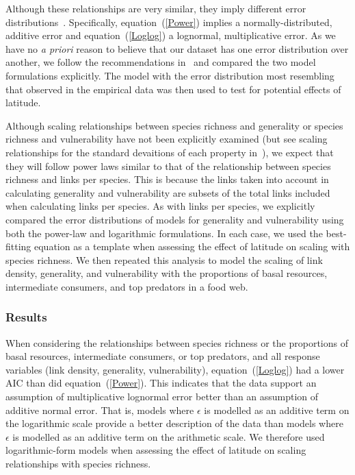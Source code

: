 \documentclass[12pt]{article}
\begin{document}
    \noindent Although these relationships are very similar, they imply different error distributions~\citep{Xiao2011}.
    Specifically, equation~(\ref{Power}) implies a normally-distributed, additive error and equation~(\ref{Loglog}) a lognormal,
    multiplicative error. As we have no \emph{a priori} reason to believe that our dataset has one error distribution
    over another, we follow the recommendations in~\citet{Xiao2011} and compared the two
    model formulations explicitly. The model with the error distribution most resembling that observed in the empirical
    data was then used to test for potential effects of latitude.


    Although scaling relationships between species richness and generality or
    species richness and vulnerability have not been explicitly examined (but see scaling 
    relationships for the standard devaitions of each property in~\citet{Riede2010}), we expect that they will follow
    power laws similar to that of the relationship between species richness and links per species.
    This is because the links taken into account in calculating generality and vulnerability are subsets 
    of the total links included when calculating links per species. As with links per species, we explicitly 
    compared the error distributions of models for generality and vulnerability using
    both the power-law and logarithmic formulations. 
    In each case, we used the best-fitting equation as a template when assessing the effect of latitude on scaling with
    species richness. We then repeated this analysis 
    to model the scaling of link density, generality, 
    and vulnerability with the proportions of basal 
    resources, intermediate consumers, and top predators
    in a food web.


  \subsubsection*{Results}

    When considering the relationships between species richness or the proportions 
    of basal resources, intermediate consumers, or top predators, and all response variables 
    (link density, generality, vulnerability), equation~(\ref{Loglog}) had a
    lower AIC than did equation~(\ref{Power}). This indicates that the
    data support an assumption of multiplicative lognormal error better than an
    assumption of additive normal error. That is, models where $\epsilon$ is
    modelled as an additive term on
    the logarithmic scale provide a better description of the data than models
    where $\epsilon$ is modelled as an additive term on the arithmetic scale.  
    We therefore used logarithmic-form models when assessing the
    effect of latitude on scaling relationships  with species richness.
\end{document}
